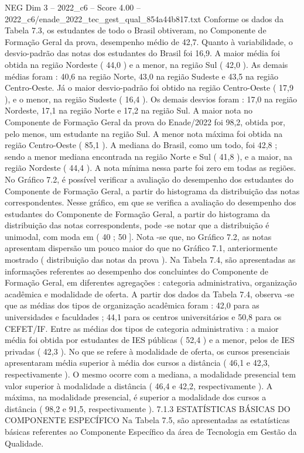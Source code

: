 \begin{textsample}{NEG Dim 3 – 2022\_c6 – Score 4.00 – 2022\_c6/enade\_2022\_tec\_gest\_qual\_854a44b817.txt}
Conforme os dados da Tabela 7.3, os estudantes de todo o Brasil obtiveram, no Componente de Formação Geral da prova, desempenho médio de 42,7.
Quanto à variabilidade, o desvio-padrão das notas dos estudantes do Brasil foi 16,9.
A maior média foi obtida na região Nordeste ( 44,0 ) e a menor, na região Sul ( 42,0 ).
As demais médias foram : 40,6 na região Norte, 43,0 na região Sudeste e 43,5 na região Centro-Oeste.
Já o maior desvio-padrão foi obtido na região Centro-Oeste ( 17,9 ), e o menor, na região Sudeste ( 16,4 ).
Os demais desvios foram : 17,0 na região Nordeste, 17,1 na região Norte e 17,2 na região Sul.
A maior nota no Componente de Formação Geral da prova do Enade/2022 foi 98,2, obtida por, pelo menos, um estudante na região Sul.
A menor nota máxima foi obtida na região Centro-Oeste ( 85,1 ).
A mediana do Brasil, como um todo, foi 42,8 ; sendo a menor mediana encontrada na região Norte e Sul ( 41,8 ), e a maior, na região Nordeste ( 44,4 ).
A nota mínima nessa parte foi zero em todas as regiões.
No Gráfico 7.2, é possível verificar a avaliação do desempenho dos estudantes do Componente de Formação Geral, a partir do histograma da distribuição das notas correspondentes.
Nesse gráfico, em que se verifica a avaliação do desempenho dos estudantes do Componente de Formação Geral, a partir do histograma da distribuição das notas correspondents, pode -se notar que a distribuição é unimodal, com moda em ( 40 ; 50 ].
Nota -se que, no Gráfico 7.2, as notas apresentam dispersão um pouco maior do que no Gráfico 7.1, anteriormente mostrado ( distribuição das notas da prova ).
Na Tabela 7.4, são apresentadas as informações referentes ao desempenho dos concluintes do Componente de Formação Geral, em diferentes agregações : categoria administrativa, organização acadêmica e modalidade de oferta.
A partir dos dados da Tabela 7.4, observa -se que as médias dos tipos de organização acadêmica foram : 42,0 para as universidades e faculdades ; 44,1 para os centros universitários e 50,8 para os CEFET/IF.
Entre as médias dos tipos de categoria administrativa : a maior média foi obtida por estudantes de IES públicas ( 52,4 ) e a menor, pelos de IES privadas ( 42,3 ).
No que se refere à modalidade de oferta, os cursos presenciais apresentaram média superior à média dos cursos a distância ( 46,1 e 42,3, respectivamente ).
O mesmo ocorre com a mediana, a modalidade presencial tem valor superior à modalidade a distância ( 46,4 e 42,2, respectivamente ).
A máxima, na modalidade presencial, é superior a modalidade dos cursos a distância ( 98,2 e 91,5, respectivamente ). 7.1.3 ESTATÍSTICAS BÁSICAS DO COMPONENTE ESPECÍFICO Na Tabela 7.5, são apresentadas as estatísticas básicas referentes ao Componente Específico da área de Tecnologia em Gestão da Qualidade.

\end{textsample}
